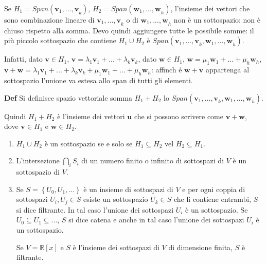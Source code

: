 \documentclass{article}
\begin{document}
Se $H_{1}=Span\left( \mathbf{v}_{1}\mathbf{,...,v}_{k}\right) $, $%
H_{2}=Span\left( \mathbf{w}_{1}\mathbf{,...,w}_{h}\right) $, l'insieme dei
vettori che sono combinazione lineare di $\mathbf{v}_{1}\mathbf{,...,v}_{k}$
o di $\mathbf{w}_{1}\mathbf{,...,w}_{h}$ non \`{e} un sottospazio: non \`{e}
chiuso rispetto alla somma. Devo quindi aggiungere tutte le possibile somme:
il pi\`{u} piccolo sottospazio che contiene $H_{1}\cup H_{2}$ \`{e} $%
Span\left( \mathbf{v}_{1}\mathbf{,...,v}_{k},\mathbf{w}_{1}\mathbf{,...,w}%
_{h}\right) $.

Infatti, dato $\mathbf{v}\in H_{1}$, $\mathbf{v}=\lambda _{1}\mathbf{v}_{1}+%
\mathbf{...+}\lambda _{k}\mathbf{v}_{k}$, dato $\mathbf{w}\in H_{1}$, $%
\mathbf{w}=\mu _{1}\mathbf{w}_{1}+\mathbf{...+}\mu _{h}\mathbf{w}_{h}$, $%
\mathbf{v+w}=\lambda _{1}\mathbf{v}_{1}+\mathbf{...+}\lambda _{k}\mathbf{v}%
_{k}+\mu _{1}\mathbf{w}_{1}+\mathbf{...+}\mu _{h}\mathbf{w}_{h}$: affinch%
\'{e} $\mathbf{w+v}$ appartenga al sottospazio l'unione va estesa allo span
di tutti gli elementi.

\textbf{Def} Si definisce spazio vettoriale somma $H_{1}+H_{2}$ lo $%
Span\left( \mathbf{v}_{1},\mathbf{...,v}_{k},\mathbf{w}_{1},\mathbf{...,w}%
_{h}\right) $.

Quindi $H_{1}+H_{2}$ \`{e} l'insieme dei vettori $\mathbf{u}$ che si possono
scrivere come $\mathbf{v+w}$, dove $\mathbf{v}\in H_{1}$ e $\mathbf{w}\in
H_{2}$.

\begin{enumerate}
\item $H_{1}\cup H_{2}$ \`{e} un sottospazio se e solo se $H_{1}\subseteq
H_{2}$ vel $H_{2}\subseteq H_{1}$.

\item L'intersezione $\bigcap_{i}S_{i}$ di un numero finito o infinito di
sottospazi di $V$ \`{e} un sottospazio di $V$.

\item Se $S=\left\{ U_{0},U_{1},...\right\} $ \`{e} un insieme di sottospazi
di $V$ e per ogni coppia di sottospazi $U_{i},U_{j}\in S$ esiste un
sottospazio $U_{k}\in S$ che li contiene entrambi, $S$ si dice filtrante. In
tal caso l'unione dei sottospazi $U_{i}$ \`{e} un sottospazio. Se $%
U_{0}\subseteq U_{1}\subseteq ...$, $S$ si dice catena e anche in tal caso
l'unione dei sottospazi $U_{i}$ \`{e} un sottospazio.

Se $V=%
\mathbb{R}
\left[ x\right] $ e $S$ \`{e} l'insieme dei sottospazi di $V$ di dimensione
finita, $S$ \`{e} filtrante.
\end{enumerate}
\end{document}
